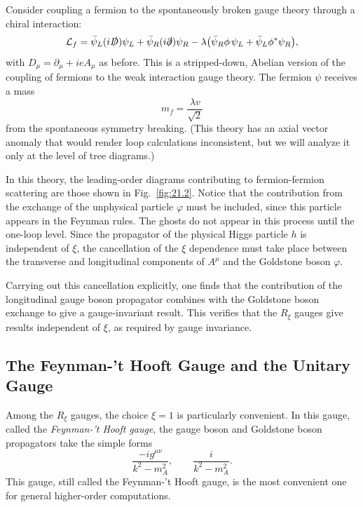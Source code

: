Consider coupling a fermion to the spontaneously broken gauge theory through
a chiral interaction:
\begin{equation}
  \mathcal{L}_f = \bar{\psi}_L(i\slashed{D})\psi_L
    + \bar{\psi}_R(i\slashed{\partial})\psi_R
    - \lambda\bigl( \bar{\psi}_R\phi\,\psi_L + \bar{\psi}_L\phi^{*}\psi_R
      \bigr) ,
  \label{eq:21.18}
\end{equation}
with $D_\mu = \partial_\mu + ieA_\mu$ as before.  This is a stripped-down,
Abelian version of the coupling of fermions to the weak interaction gauge
theory.  The fermion $\psi$ receives a mass
\begin{equation}
  m_f = \frac{\lambda v}{\sqrt{2}}
  \label{eq:21.19}
\end{equation}
from the spontaneous symmetry breaking.  (This theory has an axial vector
anomaly that would render loop calculations inconsistent, but we will analyze
it only at the level of tree diagrams.)

In this theory, the leading-order diagrams contributing to fermion-fermion
scattering are those shown in Fig.~\ref{fig:21.2}.  Notice that the
contribution from the exchange of the unphysical particle $\varphi$ must be
included, since this particle appears in the Feynman rules.  The ghosts do
not appear in this process until the one-loop level.  Since the propagator of
the physical Higgs particle $h$ is independent of $\xi$, the cancellation of
the $\xi$ dependence must take place between the transverse and longitudinal
components of $A^\mu$ and the Goldstone boson $\varphi$.

Carrying out this cancellation explicitly, one finds that the contribution
of the longitudinal gauge boson propagator combines with the Goldstone boson
exchange to give a gauge-invariant result.  This verifies that the $R_\xi$
gauges give results independent of $\xi$, as required by gauge invariance.

\subsection{The Feynman-'t Hooft Gauge and the Unitary Gauge}

Among the $R_\xi$ gauges, the choice $\xi = 1$ is particularly convenient.
In this gauge, called the \emph{Feynman-'t Hooft gauge}, the gauge boson and
Goldstone boson propagators take the simple forms
\begin{equation}
  \frac{-ig^{\mu\nu}}{k^2 - m_A^2},\qquad
  \frac{i}{k^2 - m_A^2} .
\end{equation}
This gauge, still called the Feynman-'t Hooft gauge, is the most convenient
one for general higher-order computations.


